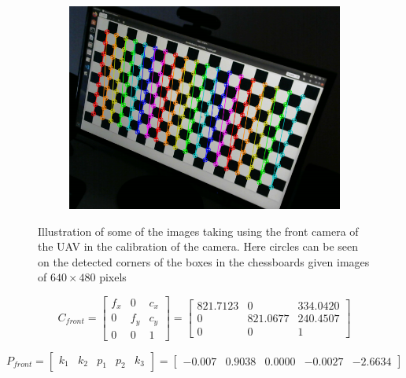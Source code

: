 \documentclass[../Head/report.tex]{subfiles}
\begin{document}
\begin{figure}[H]
    \begin{subfigure}[t]{.27\textwidth}
        \centering
        \includegraphics[width=\textwidth]{../Figures/camera_calibration/img12.png}
        \caption{}
        \label{fig:calibration_three}
    \end{subfigure}
    \caption{Illustration of some of the images taking using the front camera of the UAV in the calibration of the camera. Here circles can be seen on the detected corners of the boxes in the chessboards given images of $640\times480$ pixels}  
    \label{fig:calibration_front_camera}
\end{figure}    

\begin{equation}
C_{front} = 
\begin{bmatrix}
f_x & 0 & c_x\\
0 & f_y & c_y\\
0 & 0 & 1
\end{bmatrix}
=
\begin{bmatrix}
821.7123 & 0 & 334.0420\\
0 & 821.0677 & 240.4507\\
0 & 0 & 1
\end{bmatrix}
\label{eq:camera_matrix_front}
\end{equation}

\begin{equation}
P_{front} =
\begin{bmatrix}
k_1 & k_2 & p_1 & p_2 & k_3
\end{bmatrix}
=
\begin{bmatrix}
-0.007 & 0.9038 & 0.0000 & -0.0027 & -2.6634
\end{bmatrix}
\label{eq:distortion_coefficients_front}
\end{equation}
\end{document}

